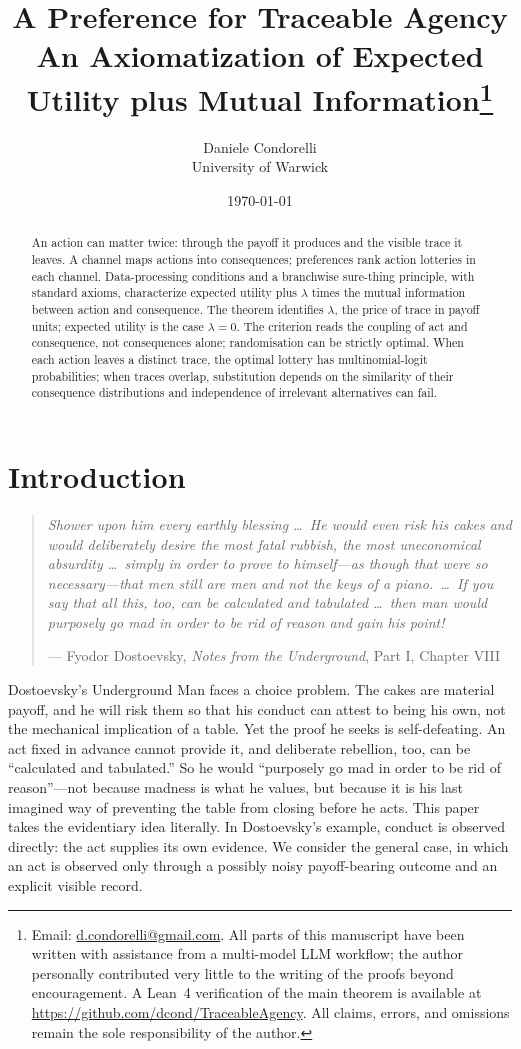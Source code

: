 \documentclass[11pt,a4paper]{article}
\title{A Preference for Traceable Agency\\[0.35em]
\large An Axiomatization of Expected Utility plus Mutual Information\thanks{Email:
\href{mailto:d.condorelli@gmail.com}{d.condorelli@gmail.com}.  All parts of this manuscript have been written with assistance
from a multi-model LLM workflow; the author personally contributed very little to the writing of the proofs
beyond encouragement.  A Lean~4 verification of the main theorem is available at
\url{https://github.com/dcond/TraceableAgency}.  All claims, errors, and omissions remain the sole responsibility
of the author.}}
\author{Daniele Condorelli\\University of Warwick}
\date{ \today}
\theoremstyle{definition}
\newcommand{\1}{\mathbf 1}
\begin{document}
\maketitle

\begin{abstract}
\noindent
An action can matter twice: through the payoff it produces and the visible trace it leaves.  A channel maps
actions into consequences; preferences rank action lotteries in each channel.  Data-processing conditions and a
branchwise sure-thing principle, with standard axioms, characterize expected utility plus $\lambda$ times the
mutual information between action and consequence.  The theorem identifies $\lambda$, the price of trace in
payoff units; expected utility is the case $\lambda=0$.  The criterion reads the coupling of act and
consequence, not consequences alone; randomisation can be strictly optimal.  When each action leaves a distinct
trace, the optimal lottery has multinomial-logit probabilities; when traces overlap, substitution depends on the
similarity of their consequence distributions and independence of irrelevant alternatives can fail.
\end{abstract}

\clearpage

\section{Introduction}


\begin{quote}
\emph{Shower upon him every earthly blessing \ldots\ He would even risk his cakes and would deliberately desire the
most fatal rubbish, the most uneconomical absurdity \ldots\ simply in order to prove to himself---as though that were
so necessary---that men still are men and not the keys of a piano.\ \ldots\ If you say that all this, too, can be
calculated and tabulated \ldots\ then man would purposely go mad in order to be rid of reason and gain his point!}

\hfill --- Fyodor Dostoevsky, \emph{Notes from the Underground}, Part I, Chapter VIII \cite{Dostoevsky1864}
\end{quote}



Dostoevsky's Underground Man faces a choice problem.  The cakes are material payoff, and he will risk them so
that his conduct can attest to being his own, not the mechanical implication of a table.  Yet the proof he seeks
is self-defeating.  An act fixed in advance cannot provide it, and deliberate rebellion, too, can be
“calculated and tabulated.”  So he would “purposely go mad in order to be rid of reason”---not because
madness is what he values, but because it is his last imagined way of preventing the table from closing before he
acts.  This paper takes the evidentiary idea literally.  In Dostoevsky's
example, conduct is observed directly: the act supplies its own evidence.  We consider the general case, in which
an act is observed only through a possibly noisy payoff-bearing outcome and an explicit visible record.
\end{document}
